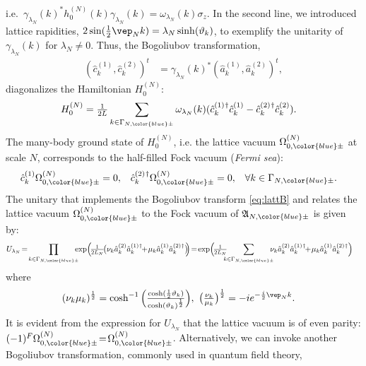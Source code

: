 \documentclass[a4paper, 11pt]{article}
\newcommand{\fA}{\mathfrak{A}}\newcommand{\cA}{\mathcal{A}}\newcommand{\dA}{\mathds{A}}\newcommand{\sA}{\mathscr{A}}
\DeclareMathOperator{\1}{\mathds{1}}
\begin{document}
i.e.~$\gamma_{\lambda_{N}}(k)^{*}h^{(N)}_{0}(k)\gamma_{\lambda_{N}}(k) = \omega_{\lambda_{N}}(k)\sigma_{z}$. In the second line, we introduced lattice rapidities, $2\sin(\tfrac{1}{2}\vep_{N}k)=\lambda_{N}\sinh(\vartheta_{k})$, to exemplify the unitarity of $\gamma_{\lambda_{N}}(k)$ for $\lambda_{N}\neq0$. Thus, the Bogoliubov transformation,
\begin{align}
\label{eq:lattB}
(\hat{c}^{(1)}_{k}, \hat{c}^{(2)}_{k})^{t} & = \gamma_{\lambda_{N}}(k)^{*}(\hat{a}^{(1)}_{k}, \hat{a}^{(2)}_{k})^{t},
\end{align}
diagonalizes the Hamiltonian $H^{(N)}_{0}$:
\begin{align}
\label{eq:diagH}
H^{(N)}_{0} & = \tfrac{1}{2L}\sum_{k\in\Gamma_{N,{\color{blue}\pm}}}\omega_{\lambda_{N}}(k)(\hat{c}^{(1)\!\!\ \dagger}_{k}\hat{c}^{(1)}_{k}-\hat{c}^{(2)\!\!\ \dagger}_{k}\hat{c}^{(2)}_{k}).
\end{align}
The many-body ground state of $H^{(N)}_{0}$, i.e. the lattice vacuum $\Omega^{(N)}_{0,{\color{blue}\pm}}$ at scale $N$, corresponds to the half-filled Fock vacuum (\textit{Fermi sea}):
\begin{align}
\label{eq:Fsea}
\hat{c}^{(1)}_{k}\Omega^{(N)}_{0,{\color{blue}\pm}} & = 0, & \hat{c}^{(2)\!\!\ \dagger}_{k}\Omega^{(N)}_{0,{\color{blue}\pm}} & = 0, & \forall k&\in\Gamma_{N,{\color{blue}\pm}}.
\end{align}
The unitary that implements the Bogoliubov transform \eqref{eq:lattB} and relates the lattice vacuum $\Omega^{(N)}_{0,{\color{blue}\pm}}$ to the Fock vacuum of $\fA_{N,{\color{blue}\pm}}$ is given by:
\begin{align}
\label{eq:lattBimp}
U_{\lambda_{N}}	& \!=\!\prod_{k\in\Gamma_{N,{\color{blue}\pm}}}\!\!\!\!\exp\!\Big(\!\tfrac{1}{2L_{N}}\!\big(\nu_{k}\hat{a}^{(2)}_{k}\hat{a} ^{(1)\!\!\ \dag}_{k}\!\!+\!\mu_{k}\hat{a}^{(1)}_{k}\hat{a}^{(2)\!\!\ \dag}_{k}\big)\!\!\Big)\!=\!\exp\!\Big(\!\tfrac{1}{2L_{N}}\!\!\!\!\sum_{k\in\Gamma_{N,{\color{blue}\pm}}}\!\!\!\!\nu_{k}\hat{a}^{(2)}_{k}\hat{a}^{(1)\!\!\ \dag}_{k}\!\!+\!\mu_{k}\hat{a}^{(1)}_{k}\hat{a}^{(2)\!\!\ \dag}_{k}\Big)
\end{align}
where
\begin{align}
\label{eq:lattBpar}
(\nu_{k}\mu_{k})^{\frac{1}{2}} & = \cosh^{-1} \Big(\tfrac{\cosh(\frac{1}{2}\vartheta_{k})}{\cosh(\vartheta_{k})^{\frac{1}{2}}}\Big),\ \big(\tfrac{\nu_{k}}{\mu_{k}}\big)^{\frac{1}{2}} = -ie^{-\frac{i}{2}\vep_{N}k}.
\end{align}
It is evident from the expression for $U_{\lambda_{N}}$ that the lattice vacuum is of even parity: $(-1)^{F}\Omega^{(N)}_{0,{\color{blue}\pm}}\!=\!\Omega^{(N)}_{0,{\color{blue}\pm}}$. Alternatively, we can invoke another Bogoliubov transformation, commonly used in quantum field theory,
\end{document}
